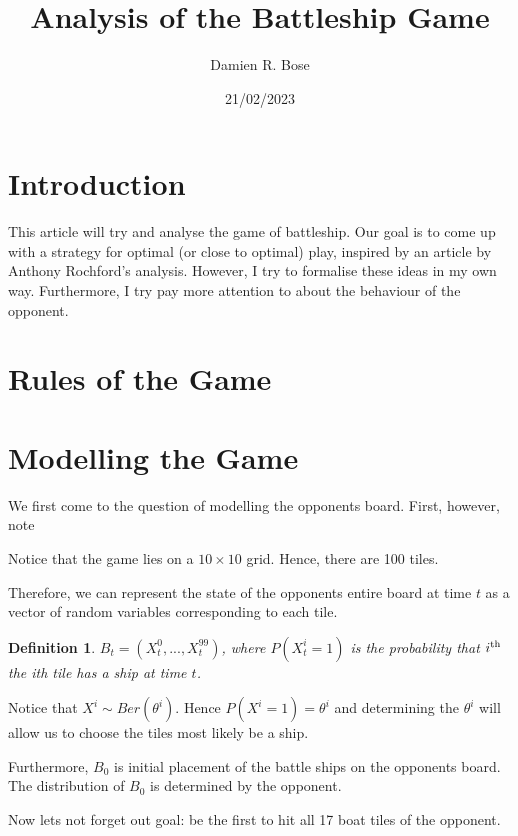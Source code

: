 \documentclass[11pt]{article}
\newtheorem{definition}{Definition}
\begin{document}
\title{Analysis of the Battleship Game}
\author{Damien R. Bose}
\date{21/02/2023}

\maketitle

\section{Introduction}

This article will try and analyse the game of battleship. Our goal is to come up with a strategy for optimal (or close to optimal) play, inspired by an article by Anthony Rochford's analysis\cite{rochford}. However, I try to formalise these ideas in my own way. Furthermore, I try pay more attention to about the behaviour of the opponent. 

\section{Rules of the Game}

\section{Modelling the Game}

We first come to the question of modelling the opponents board. First, however, note


Notice that the game lies on a $10 \times 10$ grid. Hence, there are 100 tiles.

Therefore, we can represent the state of the opponents entire board at time $t$ as a vector of random variables corresponding to each tile.

\begin{definition}
 $B_t =(X_t^0,...,X_t^{99})$, where $P(X_t^i = 1)$ is the probability that $i\textsuperscript{th}$ the ith tile has a ship at time $t$.
\end{definition}

Notice that $X^i \sim Ber(\theta^i)$. Hence $P(X^i = 1) = \theta^i$ and determining the $\theta^i$ will allow us to choose the tiles most likely be a ship.

Furthermore, $B_0$ is initial placement of the battle ships on the opponents board. The distribution of $B_0$ is determined by the opponent. 

Now lets not forget out goal: be the first to hit all 17 boat tiles of the opponent. 
\end{document}
